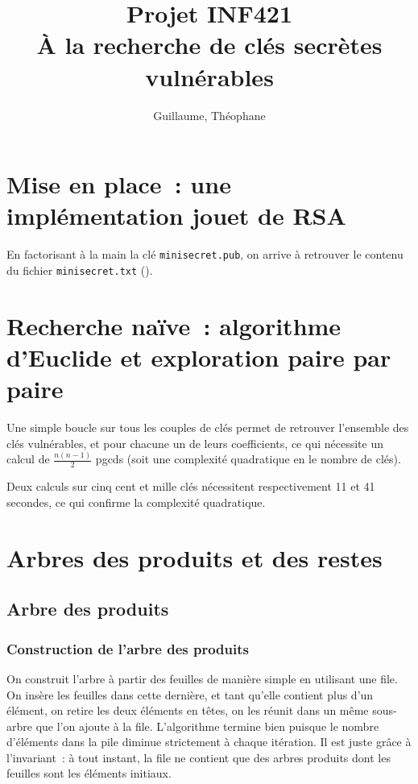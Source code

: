 \documentclass[a4paper,10pt]{article}
\title{Projet INF421 \\ À la recherche de clés secrètes vulnérables}
\author{\bsc{Hétier} Guillaume, \bsc{Hufschmitt} Théophane}
\begin{document}
\maketitle

\begin{abstract}

\end{abstract}

\section{Mise en place~: une implémentation jouet de RSA}
En factorisant à la main la clé \texttt{minisecret.pub}, on arrive à retrouver le contenu du fichier \texttt{minisecret.txt} ().
\section{Recherche naïve~: algorithme d'Euclide et exploration paire par paire}
Une simple boucle sur tous les couples de clés permet de retrouver l'ensemble des clés vulnérables, et pour chacune un de leurs coefficients, ce qui nécessite un calcul de $\frac{n(n-1)}{2}$ pgcds (soit une complexité quadratique en le nombre de clés).

  Deux calculs sur cinq cent et mille clés nécessitent respectivement 11 et 41 secondes, ce qui confirme la complexité quadratique.
\section{Arbres des produits et des restes}

  \subsection{Arbre des produits}
  \subsubsection{Construction de l'arbre des produits}
  On construit l'arbre à partir des feuilles de manière simple en utilisant une file. On insère les feuilles dans cette dernière, et tant qu'elle contient plus d'un élément, on retire les deux éléments en têtes, on les réunit dans un même sous-arbre que l'on ajoute à la file.
  L'algorithme termine bien puisque le nombre d'éléments dans la pile diminue strictement à chaque itération. Il est juste grâce à l'invariant~: à tout instant, la file ne contient que des arbres produits dont les feuilles sont les éléments initiaux.
  
\end{document}

